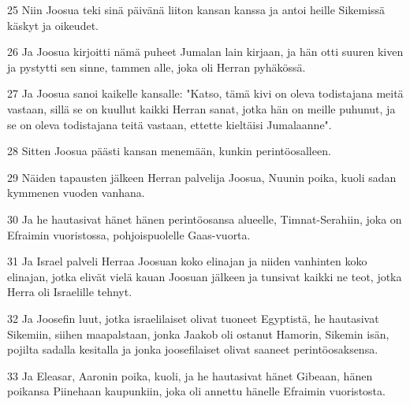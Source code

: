 \par 25 Niin Joosua teki sinä päivänä liiton kansan kanssa ja antoi heille Sikemissä käskyt ja oikeudet.
\par 26 Ja Joosua kirjoitti nämä puheet Jumalan lain kirjaan, ja hän otti suuren kiven ja pystytti sen sinne, tammen alle, joka oli Herran pyhäkössä.
\par 27 Ja Joosua sanoi kaikelle kansalle: "Katso, tämä kivi on oleva todistajana meitä vastaan, sillä se on kuullut kaikki Herran sanat, jotka hän on meille puhunut, ja se on oleva todistajana teitä vastaan, ettette kieltäisi Jumalaanne".
\par 28 Sitten Joosua päästi kansan menemään, kunkin perintöosalleen.
\par 29 Näiden tapausten jälkeen Herran palvelija Joosua, Nuunin poika, kuoli sadan kymmenen vuoden vanhana.
\par 30 Ja he hautasivat hänet hänen perintöosansa alueelle, Timnat-Serahiin, joka on Efraimin vuoristossa, pohjoispuolelle Gaas-vuorta.
\par 31 Ja Israel palveli Herraa Joosuan koko elinajan ja niiden vanhinten koko elinajan, jotka elivät vielä kauan Joosuan jälkeen ja tunsivat kaikki ne teot, jotka Herra oli Israelille tehnyt.
\par 32 Ja Joosefin luut, jotka israelilaiset olivat tuoneet Egyptistä, he hautasivat Sikemiin, siihen maapalstaan, jonka Jaakob oli ostanut Hamorin, Sikemin isän, pojilta sadalla kesitalla ja jonka joosefilaiset olivat saaneet perintöosaksensa.
\par 33 Ja Eleasar, Aaronin poika, kuoli, ja he hautasivat hänet Gibeaan, hänen poikansa Piinehaan kaupunkiin, joka oli annettu hänelle Efraimin vuoristosta.


